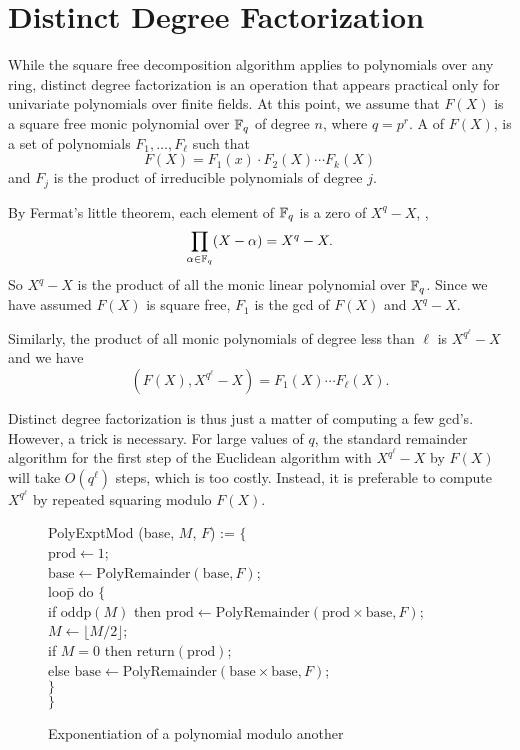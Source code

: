 \section{Distinct Degree Factorization}
\label{FFac:Distinct:Sec}

While the square free decomposition algorithm applies to polynomials
over any ring, distinct degree factorization is an operation that
appears practical only for univariate polynomials over finite fields.
At this point, we assume that $F(X)$ is a square free monic polynomial
over $\mathbb{F}_q$ of degree $n$, where $q= p^r$.  A  of $F(X)$, is a set of polynomials $F_1, \ldots,
F_{\ell}$ such that
\[
F(X) = F_1(x) \cdot F_2(X) \cdots F_k(X)
\]
and $F_j$ is the product of irreducible polynomials of degree $j$.

By Fermat's little theorem, each element of $\mathbb{F}_q$ is a zero of $X^q-
X$, \ie, 
\[
\prod_{\alpha \in \mathbb{F}_q} (X - \alpha) = X^q - X.
\]
So $X^q- X$ is the product of all the monic linear polynomial over
$\mathbb{F}_q$.  Since we have assumed $F(X)$ is square free, $F_1$ is the
{\sc gcd} of $F(X)$ and $X^q - X$.

Similarly, the product of all monic polynomials of degree less than
$\ell$ is $X^{q^\ell} -X$ and we have
\[
(F(X), X^{q^{\ell}} - X) = F_1(X) \cdots F_{\ell}(X).
\]

Distinct degree factorization is thus just a matter of computing a few
{\sc gcd}'s.  However, a trick is necessary.  For large values of $q$,
the standard remainder algorithm for the first step of the Euclidean
algorithm with $X^{q^{\ell}}-X$ by $F(X)$ will take $O(q^{\ell})$
steps, which is too costly.  Instead, it is preferable to compute
$X^{q^{\ell}}$ by repeated squaring modulo $F(X)$.  

\begin{figure}
\begindsacode
PolyExptMod (base, $M$, $F$) := $\{$ \\
\> $\mbox{prod} \leftarrow 1$; \\
\> $\mbox{base} \leftarrow \mbox{PolyRemainder}(\mbox{base}, F)$; \\
\> loo\=p do $\{$\\
\>\> if $\mbox{oddp}(M)$ then $\mbox{prod} \leftarrow \mbox{PolyRemainder}(\mbox{prod} \times \mbox{base}, F)$;\\
\>\> $M \leftarrow \lfloor M/2 \rfloor$; \\
\>\> if $M = 0$ then $\mbox{return}(\mbox{prod})$;\\
\>\> else $\mbox{base} \leftarrow \mbox{PolyRemainder}(\mbox{base}
  \times\mbox{base}, F)$; \\
\>\> $\}$\\
\>$\}$
\enddsacode
\caption{Exponentiation of a polynomial modulo
another\label{PolyExptMod:Fig}}
\end{figure}

